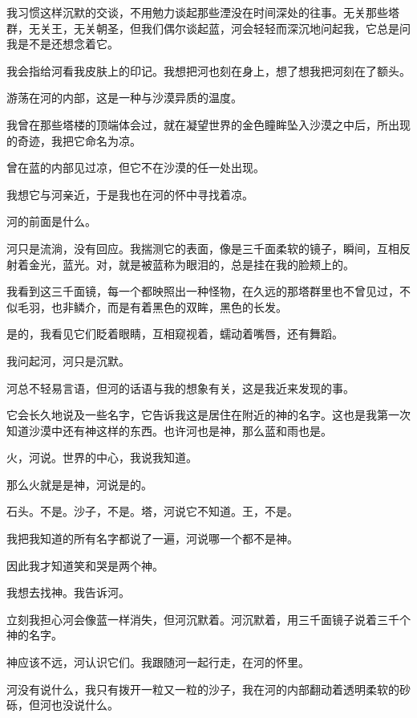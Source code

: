 \documentclass[UTF8]{article}
\begin{document}
\par 我习惯这样沉默的交谈，不用勉力谈起那些湮没在时间深处的往事。无关那些塔群，无关王，无关朝圣，但我们偶尔谈起蓝，河会轻轻而深沉地问起我，它总是问我是不是还想念着它。
\par 我会指给河看我皮肤上的印记。我想把河也刻在身上，想了想我把河刻在了额头。
\\[0.6cm]
\par 游荡在河的内部，这是一种与沙漠异质的温度。
\par 我曾在那些塔楼的顶端体会过，就在凝望世界的金色瞳眸坠入沙漠之中后，所出现的奇迹，我把它命名为凉。
\par 曾在蓝的内部见过凉，但它不在沙漠的任一处出现。
\par 我想它与河亲近，于是我也在河的怀中寻找着凉。
\\[0.6cm]
\par 河的前面是什么。
\par 河只是流淌，没有回应。我揣测它的表面，像是三千面柔软的镜子，瞬间，互相反射着金光，蓝光。对，就是被蓝称为眼泪的，总是挂在我的脸颊上的。
\par 我看到这三千面镜，每一个都映照出一种怪物，在久远的那塔群里也不曾见过，不似毛羽，也非鳞介，而是有着黑色的双眸，黑色的长发。
\par 是的，我看见它们眨着眼睛，互相窥视着，蠕动着嘴唇，还有舞蹈。
\par 我问起河，河只是沉默。
\par 河总不轻易言语，但河的话语与我的想象有关，这是我近来发现的事。
\par 它会长久地说及一些名字，它告诉我这是居住在附近的神的名字。这也是我第一次知道沙漠中还有神这样的东西。也许河也是神，那么蓝和雨也是。
\par 火，河说。世界的中心，我说我知道。
\par 那么火就是是神，河说是的。
\par 石头。不是。沙子，不是。塔，河说它不知道。王，不是。
\par 我把我知道的所有名字都说了一遍，河说哪一个都不是神。
\\[0.6cm]
\par 因此我才知道笑和哭是两个神。
\par 我想去找神。我告诉河。
\\[0.6cm]
\par 立刻我担心河会像蓝一样消失，但河沉默着。河沉默着，用三千面镜子说着三千个神的名字。
\par 神应该不远，河认识它们。我跟随河一起行走，在河的怀里。
\par 河没有说什么，我只有拨开一粒又一粒的沙子，我在河的内部翻动着透明柔软的砂砾，但河也没说什么。
\end{document}
